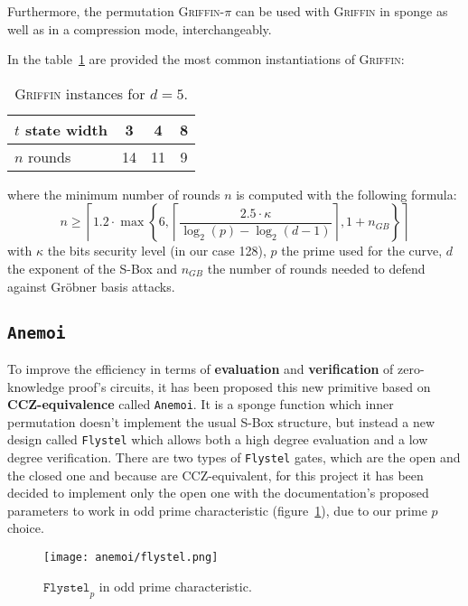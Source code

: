 \documentclass[12pt, a4paper]{report}
\begin{document}
Furthermore, the permutation \textsc{Griffin-$\pi$} can be used with \textsc{Griffin} in sponge as well as in a compression mode, interchangeably. 

In the table~\ref{tab:griffininstances} are provided the most common instantiations of \textsc{Griffin}:
\begin{table}[H]
  \begin{center}
    \begin{tabular}{|l|c|c|c|}
      \hline
      $t$ state width & 3 & 4 & 8 \\
      \hline
      $n$ rounds & 14 & 11 & 9 \\
      \hline
    \end{tabular}
  \end{center}
  \caption{\textsc{Griffin} instances for $d = 5$.}\label{tab:griffininstances}
\end{table}
where the minimum number of rounds $n$ is computed with the following formula:
\begin{equation}
  n \ge \left\lceil 1.2 \cdot \max \left\{6, \left\lceil \frac{2.5 \cdot \kappa}{\log_2(p) - \log_2(d-1)} \right\rceil, 1 + n_{GB} \right\} \right\rceil
  \label{eq:griffinrounds}
\end{equation}
with $\kappa$ the bits security level (in our case 128), $p$ the prime used for the curve, $d$ the exponent of the S-Box and $n_{GB}$ the number of rounds needed to defend against Gr\"obner basis attacks.

\subsection{\texttt{Anemoi}}\label{subsec:anemoi}

To improve the efficiency in terms of \textbf{evaluation} and \textbf{verification} of zero-knowledge proof's circuits, it has been proposed this new primitive based on \textbf{CCZ-equivalence} called \texttt{Anemoi}. It is a sponge function which inner permutation doesn't implement the usual S-Box structure, but instead a new design called \texttt{Flystel} which allows both a high degree evaluation and a low degree verification.
There are two types of \texttt{Flystel} gates, which are the open and the closed one and because are CCZ-equivalent, for this project it has been decided to implement only the open one with the documentation's proposed parameters to work in odd prime characteristic (figure~\ref{fig:flystel}), due to our prime $p$ choice.

\begin{figure}[H]
  \begin{center}
    \texttt{[image: anemoi/flystel.png]}
  \end{center}
  \caption{$\texttt{Flystel}_p$ in odd prime characteristic.}\label{fig:flystel}
\end{figure}
\end{document}
